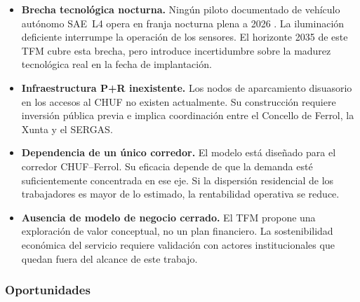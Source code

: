 \begin{itemize}

	\item \textbf{Brecha tecnológica nocturna.} Ningún piloto
	documentado de vehículo autónomo SAE~L4 opera en franja
	nocturna plena a 2026 \parencite{SHOW2024Legacy}. La iluminación
	deficiente interrumpe la operación de los sensores. El
	horizonte 2035 de este TFM cubre esta brecha, pero introduce
	incertidumbre sobre la madurez tecnológica real en la
	fecha de implantación.

	\item \textbf{Infraestructura P+R inexistente.} Los nodos
	de aparcamiento disuasorio en los accesos al CHUF no
	existen actualmente. Su construcción requiere inversión
	pública previa e implica coordinación entre el Concello
	de Ferrol, la Xunta y el SERGAS.

	\item \textbf{Dependencia de un único corredor.} El modelo
	está diseñado para el corredor CHUF--Ferrol. Su eficacia
	depende de que la demanda esté suficientemente concentrada
	en ese eje. Si la dispersión residencial de los trabajadores
	es mayor de lo estimado, la rentabilidad operativa se reduce.

	\item \textbf{Ausencia de modelo de negocio cerrado.}
	El TFM propone una exploración de valor conceptual, no un
	plan financiero. La sostenibilidad económica del servicio
	requiere validación con actores institucionales que
	quedan fuera del alcance de este trabajo.

\end{itemize}

\subsubsection{Oportunidades}
\label{sec:dafo-oportunidades}

